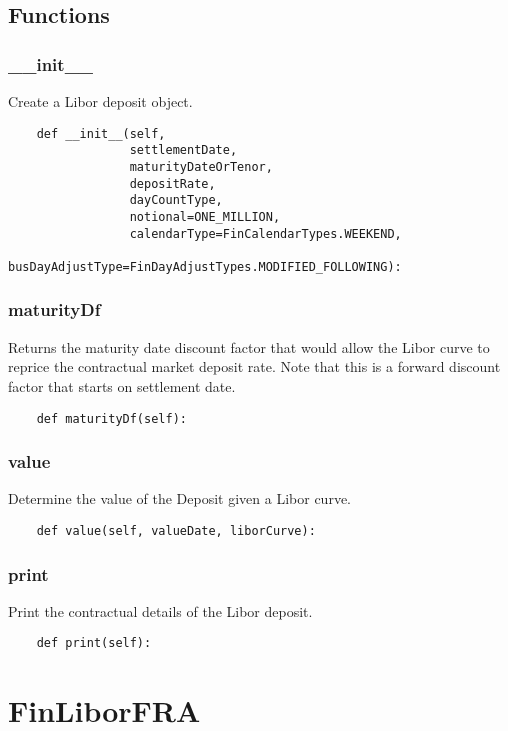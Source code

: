 \documentclass[twoside,11pt]{book}
\begin{document}
\subsection*{Functions}

\subsubsection*{{\bf \_\_init\_\_}}
Create a Libor deposit object.  

\begin{lstlisting}
    def __init__(self,
                 settlementDate,
                 maturityDateOrTenor,
                 depositRate,
                 dayCountType,
                 notional=ONE_MILLION,
                 calendarType=FinCalendarTypes.WEEKEND,
                 busDayAdjustType=FinDayAdjustTypes.MODIFIED_FOLLOWING):
\end{lstlisting}

\subsubsection*{{\bf maturityDf}}
Returns the maturity date discount factor that would allow the Libor curve to reprice the contractual market deposit rate. Note that this is a forward discount factor that starts on settlement date. 

\begin{lstlisting}
    def maturityDf(self):
\end{lstlisting}

\subsubsection*{{\bf value}}
Determine the value of the Deposit given a Libor curve.  

\begin{lstlisting}
    def value(self, valueDate, liborCurve):
\end{lstlisting}

\subsubsection*{{\bf print}}
Print the contractual details of the Libor deposit.  

\begin{lstlisting}
    def print(self):
\end{lstlisting}

\newpage
\section{FinLiborFRA}
\end{document}
